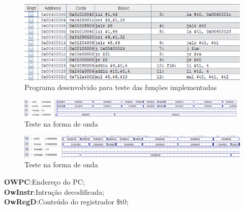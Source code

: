 \documentclass[12pt]{article}
\begin{document}
\begin{figure}[H]
	\flushleft
	\includegraphics[width=1\textwidth]{programa.png}
	\caption{Programa desenvolvido para teste das funções implementadas}
	\label{fig:pest}
\end{figure}
\begin{figure}[H]
	\flushleft
	\includegraphics[width=1\textwidth]{teste.png}
	\caption{Teste na forma de onda}
	\label{fig:pest}
\end{figure}
\begin{figure}[H]
	\flushleft
	\includegraphics[width=1\textwidth]{images/teste1.png}
	\caption{Teste na forma de onda}
	\label{fig:pest}
\end{figure}


\textbf{OWPC}:Endereço do PC;\\
\textbf{OwInstr}:Intrução decodificada;\\
\textbf{OwRegD}:Conteúdo do registrador \$t0;\\



\end{document}

